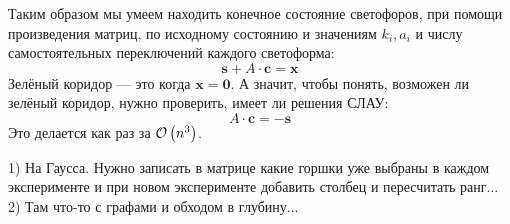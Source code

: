 \begin{solution}
Таким образом мы умеем находить конечное состояние светофоров, при помощи произведения матриц, по исходному состоянию и значениям $k_i, a_i$ и числу самостоятельных переключений каждого светоформа:
\[
	\bm{s} + A\cdot\bm{c} = \bm{x}
\]
Зелёный коридор --- это когда $\bm{x} = \bm{0}$. А значит, чтобы понять, возможен ли зелёный коридор, нужно проверить, имеет ли решения СЛАУ:
\[
	A\cdot\bm{c} = -\bm{s}
\]
Это делается как раз за $\mathcal{O}\left(n^3\right)$. \xqed
\end{solution}

\begin{task}[4]
\end{task}
\begin{solution}
1) На Гаусса. Нужно записать в матрице какие горшки уже выбраны в каждом эксперименте и при новом эксперименте добавить столбец и пересчитать ранг...
2) Там что-то с графами и обходом в глубину...
\end{solution}


